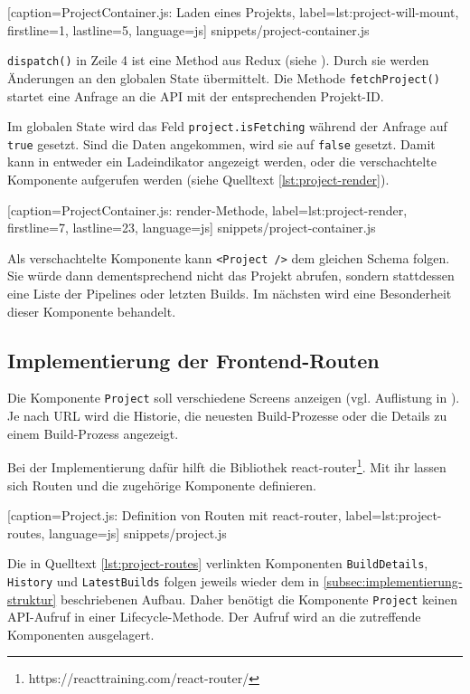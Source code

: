 
  [caption={ProjectContainer.js: Laden eines Projekts},
  label={lst:project-will-mount},
  firstline=1,
  lastline=5,
  language=js]
  {snippets/project-container.js}

\texttt{dispatch()} in Zeile 4 ist eine Method aus Redux (siehe ). Durch sie werden Änderungen an den globalen State übermittelt. Die Methode \texttt{fetchProject()} startet eine Anfrage an die API mit der entsprechenden Projekt-ID.

Im globalen State wird das Feld \texttt{project.isFetching} während der Anfrage auf \texttt{true} gesetzt. Sind die Daten angekommen, wird sie auf \texttt{false} gesetzt. Damit kann in entweder ein Ladeindikator angezeigt werden, oder die verschachtelte Komponente aufgerufen werden (siehe Quelltext \ref{lst:project-render}).


  [caption={ProjectContainer.js: render-Methode},
  label={lst:project-render},
  firstline=7,
  lastline=23,
  language=js]
  {snippets/project-container.js}

Als verschachtelte Komponente kann \texttt{<Project />} dem gleichen Schema folgen. Sie würde dann  dementsprechend nicht das Projekt abrufen, sondern stattdessen eine Liste der Pipelines oder letzten Builds. Im nächsten  wird eine Besonderheit dieser Komponente behandelt.

\subsection{Implementierung der Frontend-Routen}
\label{subsec:react-routes}

Die Komponente \texttt{Project} soll verschiedene Screens anzeigen (vgl. Auflistung in ). Je nach URL wird die Historie, die neuesten Build-Prozesse oder die Details zu einem Build-Prozess angezeigt.

Bei der Implementierung dafür hilft die Bibliothek react-router\footnote{https://reacttraining.com/react-router/}. Mit ihr lassen sich Routen und die zugehörige Komponente definieren.


  [caption={Project.js: Definition von Routen mit react-router},
  label={lst:project-routes},
  language=js]
  {snippets/project.js}

Die in Quelltext \ref{lst:project-routes} verlinkten Komponenten \texttt{BuildDetails}, \texttt{History} und \texttt{Latest\-Builds} folgen jeweils wieder dem in \autoref{subsec:implementierung-struktur} beschriebenen Aufbau. Daher benötigt die Komponente \texttt{Project} keinen API-Aufruf in einer Lifecycle-Methode. Der Aufruf wird an die zutreffende Komponenten ausgelagert.

